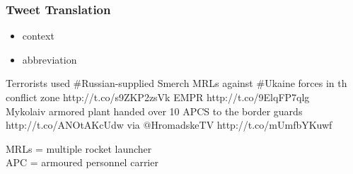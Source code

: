 \documentclass[12pt]{beamer}
\begin{document}
\begin{frame}
	\frametitle{Tweet Translation}
	\begin{itemize}
		\item \textcolor{TCTsilver}{\Large context}
		\item \textcolor{TCTsilver}{\Large abbreviation}
	\end{itemize}
\end{frame}


\begin{frame}
	\begin{center}
		Terrorists used \#Russian-supplied Smerch \alert<2>{MRL}s against \#Ukaine forces in th conflict zone http://t.co/s9ZKP2zsVk EMPR http://t.co/9ElqFP7qlg
		\\[0.7cm]
		Mykolaiv armored plant handed over 10 \alert<2>{APC}S  to the border guards  http://t.co/ANOtAKcUdw via $@$HromadskeTV http://t.co/mUmfbYKuwf
	\end{center}
	 {MRLs = multiple rocket launcher\\
	APC = armoured personnel carrier}
\end{frame}
\end{document}
